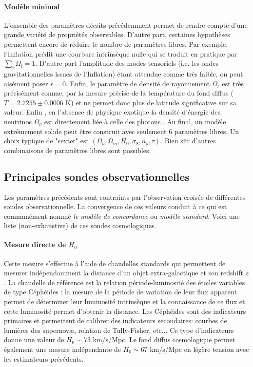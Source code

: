\paragraph{Modèle minimal} L'ensemble des paramètres décrits précédemment permet de rendre compte d'une grande variété de propriétés observables. D'autre part, certaines hypothèses permettent encore de réduire le nombre de paramètres libres. Par exemple, l'Inflation prédit une courbure intrinsèque nulle qui se traduit en pratique par $\sum_i \Omega_i=1$. D'autre part l'amplitude des modes tensoriels (i.e. les ondes gravitationnelles issues de l'Inflation) étant attendue comme très faible, on peut aisément poser $r=0$. Enfin, le paramètre de densité de rayonnement $\Omega_r$ est très précisément connue, par la mesure précise de la température  du fond diffus ($T=2.7255\pm0.0006$ K) et ne permet donc plus de latitude significative sur sa valeur. Enfin , en l'absence de physique exotique la densité d'énergie des neutrinos $\Omega_\nu$ est directement liée à celle des photons . Au final, un modèle extrêmement solide peut être construit avec seulement 6 paramètres libres. Un choix typique de "sextet" est $(\Omega_b,\Omega_m, H_0,\sigma_8,n_s,\tau)$. Bien sûr d'autres combinaisons de paramètres libres sont possibles.

\subsection{Principales sondes observationnelles}

Les paramètres précédents sont contraints par l'observation croisée de différentes sondes observationnelle. La convergence de ces valeurs conduit à ce qui est communément nommé \textit{le modèle de concordance} ou \textit{modèle standard}. Voici une liste (non-exhaustive) de ces sondes cosmologiques.

\paragraph{Mesure directe de $H_0$}
Cette mesure s'effectue à l'aide de chandelles standards qui permettent de mesurer indépendamment la distance d'un objet extra-galactique et son redshift $z$. La chandelle de référence est la relation période-luminosité des étoiles variables de type Céphéides : la mesure de la période de variation de leur flux apparent permet de déterminer leur luminosité intrinsèque  et la connaissance de ce flux et cette luminosité permet d'obtenir la distance. Les Céphéides sont des indicateurs primaires et permettent de calibrer des indicateurs secondaires: courbes de lumières des supernovæ, relation de Tully-Fisher, etc... Ce type d'indicateurs donne une valeur de $H_0\sim 73$ km/s/Mpc. Le fond diffus cosmologique permet également une mesure indépendante de $H_0\sim 67$ km/s/Mpc en légère tension avec les estimateurs précédents.

